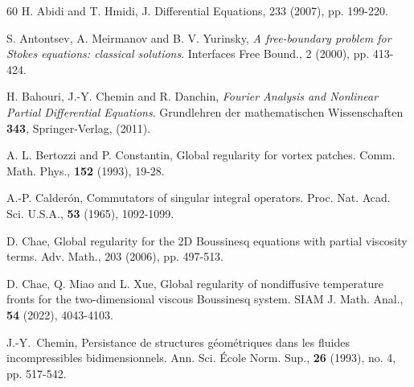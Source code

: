 \documentclass[reqno,11pt,a4paper]{amsart}
\begin{document}
\begin{thebibliography}{60}
 H. Abidi and T. Hmidi,  J. Differential
Equations, 233 (2007), pp. 199-220.

S. Antontsev, A. Meirmanov and B. V. Yurinsky, {\it A free-boundary problem for Stokes equations: classical solutions}.
Interfaces Free Bound., 2 (2000), pp. 413-424.

H. Bahouri, J.-Y. Chemin and R. Danchin, 
\textit{Fourier Analysis and Nonlinear Partial Differential Equations}. 
Grundlehren der mathematischen Wissenschaften \textbf{343}, Springer-Verlag, (2011).

A. L. Bertozzi and P. Constantin, 
Global regularity for vortex patches.
Comm. Math. Phys., \textbf{152} (1993), 19-28.

A.-P. Calder\'on,
Commutators of singular integral operators.
Proc. Nat. Acad. Sci. U.S.A., \textbf{53} (1965), 1092-1099.



D. Chae, 
Global regularity for the 2D Boussinesq equations with partial viscosity terms. 
Adv. Math., 203 (2006), pp. 497-513.

D. Chae, Q. Miao and L. Xue,
Global regularity of nondiffusive temperature fronts for the two-dimensional viscous Boussinesq system.
SIAM J. Math. Anal., \textbf{54} (2022), 4043-4103.



J.-Y.~Chemin,
Persistance de structures g\'eom\'etriques dans les fluides incompressibles bidimensionnels.
Ann. Sci. \'Ecole Norm. Sup., \textbf{26} (1993), no. 4, pp. 517-542.


\end{thebibliography}
\end{document}
